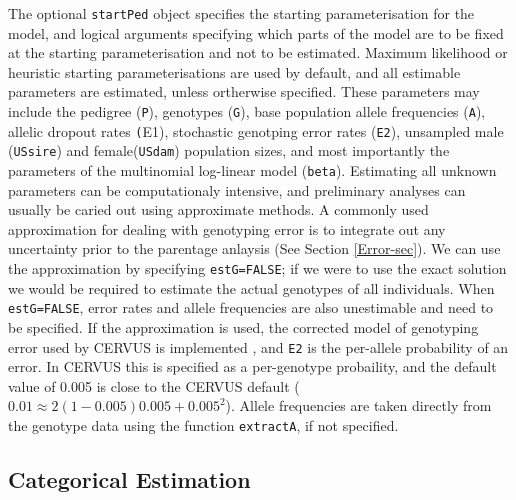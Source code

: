 \documentclass{article}
\begin{document}
The optional \texttt{startPed} object specifies the starting parameterisation for the model, and logical arguments specifying which parts of the model are to be fixed at the starting parameterisation and not to be estimated. Maximum likelihood or heuristic starting parameterisations are used by default, and all estimable parameters are estimated, unless ortherwise specified. These parameters may include the pedigree (\texttt{P}), genotypes (\texttt{G}), base population allele frequencies (\texttt{A}), allelic dropout rates \texttt(E1), stochastic genotping error rates (\texttt {E2}), unsampled male (\texttt{USsire}) and female(\texttt{USdam}) population sizes, and most importantly the parameters of the multinomial log-linear model (\texttt{beta}). Estimating all unknown parameters can be computationaly intensive, and preliminary analyses can usually be caried out using approximate methods.  A commonly used approximation for dealing with genotyping error is to integrate out any uncertainty prior to the parentage anlaysis (See Section \ref{Error-sec}).  We can use the approximation by specifying \texttt{estG=FALSE}; if we were to use the exact solution we would be required to estimate the actual genotypes of all individuals.  When \texttt{estG=FALSE}, error rates and allele frequencies are also unestimable and need to be specified.  If the approximation is used, the corrected model of genotyping error used by CERVUS is implemented \citep{Kalinowski.2006}, and \texttt{E2} is the per-allele probability of an error.  In CERVUS this is specified as a per-genotype probaility, and the default value of 0.005 is close to the CERVUS default ($0.01 \approx 2(1-0.005)0.005+0.005^{2}$).  Allele frequencies are taken directly from the genotype data using the function \texttt{extractA}, if not specified.  


\subsection{Categorical Estimation}
\label{cat-sec}
\end{document}
